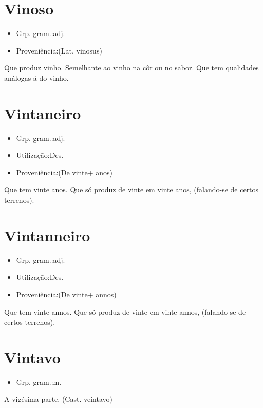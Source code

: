 \documentclass{article}
\begin{document}
\section{Vinoso}
\begin{itemize}
\item {Grp. gram.:adj.}
\end{itemize}
\begin{itemize}
\item {Proveniência:(Lat. \textunderscore vinosus\textunderscore )}
\end{itemize}
Que produz vinho.
Semelhante ao vinho na côr ou no sabor.
Que tem qualidades análogas á do vinho.
\section{Vintaneiro}
\begin{itemize}
\item {Grp. gram.:adj.}
\end{itemize}
\begin{itemize}
\item {Utilização:Des.}
\end{itemize}
\begin{itemize}
\item {Proveniência:(De \textunderscore vinte\textunderscore  + \textunderscore anos\textunderscore )}
\end{itemize}
Que tem vinte anos.
Que só produz de vinte em vinte anos, (falando-se de certos terrenos).
\section{Vintanneiro}
\begin{itemize}
\item {Grp. gram.:adj.}
\end{itemize}
\begin{itemize}
\item {Utilização:Des.}
\end{itemize}
\begin{itemize}
\item {Proveniência:(De \textunderscore vinte\textunderscore  + \textunderscore annos\textunderscore )}
\end{itemize}
Que tem vinte annos.
Que só produz de vinte em vinte annos, (falando-se de certos terrenos).
\section{Vintavo}
\begin{itemize}
\item {Grp. gram.:m.}
\end{itemize}
A vigésima parte.
(Cast. \textunderscore veintavo\textunderscore )
\end{document}
